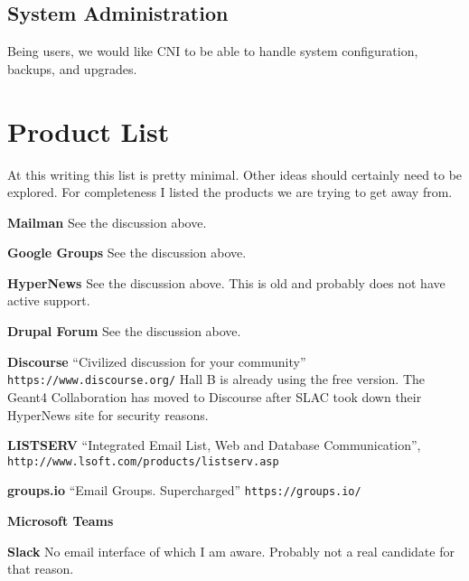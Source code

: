 \documentclass{article}
\begin{document}
\subsection{System Administration}

Being users, we would like CNI to be able to handle system
configuration, backups, and upgrades.

\section{Product List}

At this writing this list is pretty minimal. Other ideas should
certainly need to be explored. For completeness I listed the products
we are trying to get away from.

\begin{description}

\item{\bf Mailman} See the discussion above.

\item{\bf Google Groups} See the discussion above.

\item{\bf HyperNews} See the discussion above. This is old and probably does not have active support.

\item{\bf Drupal Forum} See the discussion above.

\item{\bf Discourse} ``Civilized discussion for your community''
{\tt https://www.discourse.org/} Hall B is already using the free version. The
  Geant4 Collaboration has moved to Discourse after SLAC took down
  their HyperNews site for security reasons.

  \item{\bf LISTSERV} ``Integrated Email List, Web and Database Communication'', {\tt http://www.lsoft.com/products/listserv.asp}

\item{\bf groups.io} ``Email Groups. Supercharged'' {\tt https://groups.io/}

\item{\bf Microsoft Teams}

\item{\bf Slack} No email interface of which I am aware. Probably not a real candidate for that reason.

\end{description}
\end{document}
